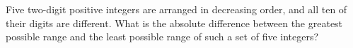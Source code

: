 Five two-digit positive integers are arranged in decreasing order, and all ten of their digits are different. What is the absolute difference between the greatest possible range and the least possible range of such a set of five integers?
